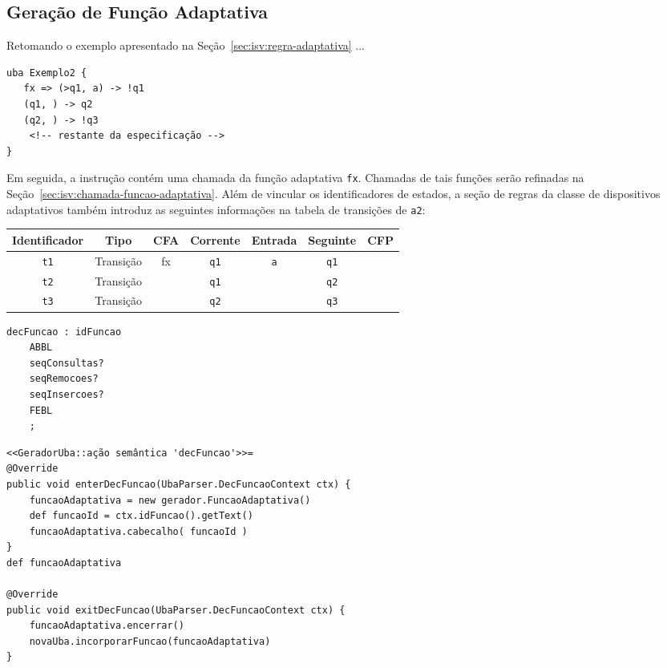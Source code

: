 \subsection{Geração de Função Adaptativa}
\label{sec:isv:geracao-funcao}

Retomando o exemplo apresentado na Seção~\ref{sec:isv:regra-adaptativa} ...

\begin{lstlisting}
uba Exemplo2 {
   fx => (>q1, a) -> !q1
   (q1, ) -> q2
   (q2, ) -> !q3
	<!-- restante da especificação -->
}
\end{lstlisting}

Em seguida, a instrução contém uma chamada da função adaptativa \lstinline|fx|. Chamadas de tais funções serão refinadas na Seção~\ref{sec:isv:chamada-funcao-adaptativa}. Além de vincular os identificadores de estados, a seção de regras da classe de dispositivos adaptativos também introduz as seguintes informações na tabela de transições de \lstinline|a2|:

\begin{center}\begin{tabular}{c c c c c c c}
Identificador   & Tipo  & CFA    & Corrente & Entrada & Seguinte & CFP \\
\hline
\lstinline|t1|	& Transição & fx  & \lstinline|q1| & \lstinline|a| & \lstinline|q1| & \\
\lstinline|t2|	& Transição &   & \lstinline|q1| & & \lstinline|q2| & \\
\lstinline|t3|	& Transição &   & \lstinline|q2| & & \lstinline|q3| & \\
\end{tabular}\end{center}

\begin{lstlisting}[style=antlr]
decFuncao : idFuncao
	ABBL
	seqConsultas?
	seqRemocoes?
	seqInsercoes?
	FEBL
	;
\end{lstlisting}

\begin{lstlisting}
<<GeradorUba::ação semântica 'decFuncao'>>=
@Override
public void enterDecFuncao(UbaParser.DecFuncaoContext ctx) {
    funcaoAdaptativa = new gerador.FuncaoAdaptativa()
    def funcaoId = ctx.idFuncao().getText()
    funcaoAdaptativa.cabecalho( funcaoId )
}
def funcaoAdaptativa

@Override
public void exitDecFuncao(UbaParser.DecFuncaoContext ctx) {
    funcaoAdaptativa.encerrar()
    novaUba.incorporarFuncao(funcaoAdaptativa)
}
\end{lstlisting}

